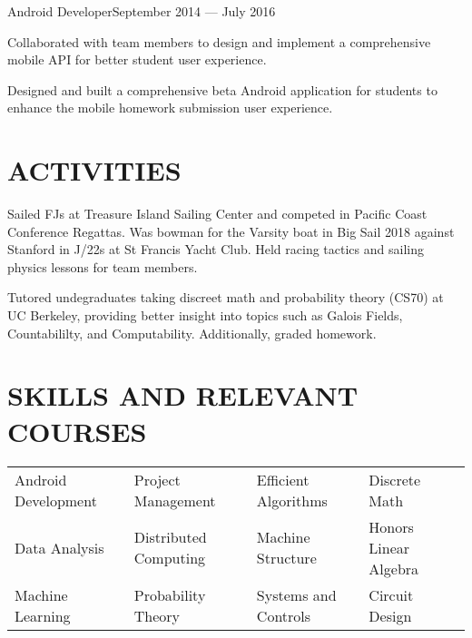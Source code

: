 \documentclass[10pt]{article}
\begin{document}
                  	 
                {Android Developer}{September 2014 --- July 2016}
                 			\begin{accomplishments}					        
                   			\item Collaborated with team members to design and implement a comprehensive mobile API for better student user experience.
                   			\item Designed and built a comprehensive beta Android application for students to enhance the mobile homework submission user experience.
                  		 \end{accomplishments}
                  		 
                  
\section*{ACTIVITIES}
        {Sailed FJs at Treasure Island Sailing Center and competed in Pacific Coast Conference Regattas. Was bowman for the Varsity boat in Big Sail 2018 against Stanford in J/22s at St Francis Yacht Club. Held racing tactics and sailing physics lessons for team members.}

				{Tutored undegraduates taking discreet math and probability theory (CS70) at UC Berkeley, providing 	better insight into topics such as Galois Fields, Countabililty, and Computability. Additionally, graded homework.}

                


\section*{SKILLS AND RELEVANT COURSES}
				\setlength{\columnsep}{.5pt}
				\begin{tabu}{X[2c]X[2.1c]X[2c]X[2c]}
					Android Development  & Project Management & Efficient Algorithms & Discrete Math \\
					Data Analysis 			   & Distributed Computing & Machine Structure & Honors Linear Algebra \\
					Machine Learning		   & Probability Theory & Systems and Controls & Circuit Design \\
				\end{tabu}
 
\end{document}
